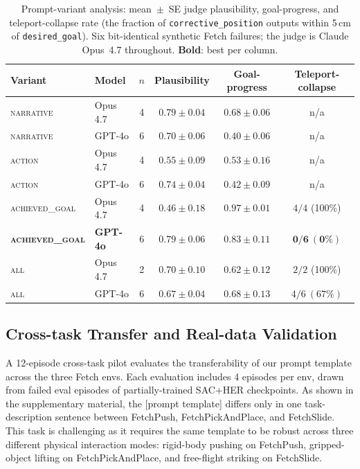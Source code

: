 \documentclass{article}
\begin{document}
\begin{table}[!t]
\centering
\footnotesize
\caption{Prompt-variant analysis: mean~$\pm$~SE judge plausibility,
goal-progress, and teleport-collapse rate (the fraction of
\texttt{corrective\_position} outputs within 5\,cm of
\texttt{desired\_goal}). Six bit-identical synthetic Fetch failures;
the judge is Claude Opus~4.7 throughout. \textbf{Bold}: best per column.}
\label{tab:prompt-variants}
\begin{tabular}{ll cccc}
\toprule
Variant & Model & $n$ & Plausibility & Goal-progress & Teleport-collapse \\
\midrule
\textsc{narrative}    & Opus 4.7 & 4 & $\mathbf{0.79\pm 0.04}$ & $\mathbf{0.68\pm 0.06}$ & n/a \\
\textsc{narrative}    & GPT-4o   & 6 & $0.70\pm 0.06$ & $0.40\pm 0.06$ & n/a \\
\textsc{action}       & Opus 4.7 & 4 & $0.55\pm 0.09$ & $0.53\pm 0.16$ & n/a \\
\textsc{action}       & GPT-4o   & 6 & $\mathbf{0.74\pm 0.04}$ & $0.42\pm 0.09$ & n/a \\
\textsc{achieved\_goal} & Opus 4.7 & 4 & $0.46\pm 0.18$ & $\mathbf{0.97\pm 0.01}$ & $4/4$ (100\%) \\
\textbf{\textsc{achieved\_goal}} & \textbf{GPT-4o} & 6 & $\mathbf{0.79\pm 0.06}$ & $0.83\pm 0.11$ & $\mathbf{0/6\ (0\%)}$ \\
\textsc{all}          & Opus 4.7 & 2 & $0.70\pm 0.10$ & $0.62\pm 0.12$ & $2/2$ (100\%) \\
\textsc{all}          & GPT-4o   & 6 & $0.67\pm 0.04$ & $0.68\pm 0.13$ & $4/6\ (67\%)$ \\
\bottomrule
\end{tabular}
\end{table}

\subsection{Cross-task Transfer and Real-data Validation}
\label{sec:exp:real}

A 12-episode cross-task pilot evaluates the transferability of our
prompt template across the three Fetch envs. Each evaluation
includes 4 episodes per env, drawn from failed eval episodes of
partially-trained SAC+HER checkpoints. As shown in the supplementary
material, the [prompt template] differs only in one task-description
sentence between FetchPush, FetchPickAndPlace, and FetchSlide. This
task is challenging as it requires the same template to be robust
across three different physical interaction modes: rigid-body
pushing on FetchPush, gripped-object lifting on FetchPickAndPlace,
and free-flight striking on FetchSlide.
\end{document}
